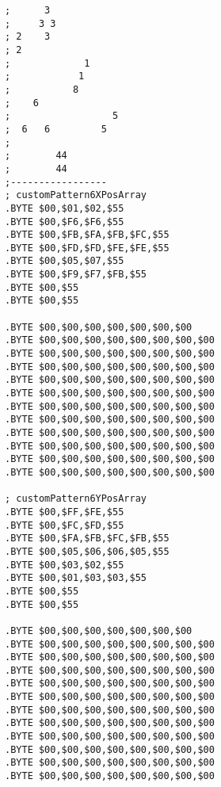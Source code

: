 \begin{minipage}[b]{0.33\linewidth}
\begin{lrbox}{\mybox}%
\begin{lstlisting}[basicstyle=\ttfamily\tiny]
;      3            
;     3 3           
; 2    3            
; 2                 
;             1     
;            1      
;           8       
;    6              
;                  5
;  6   6         5  
;                   
;        44         
;        44         
;-----------------
; customPattern6XPosArray
.BYTE $00,$01,$02,$55
.BYTE $00,$F6,$F6,$55
.BYTE $00,$FB,$FA,$FB,$FC,$55
.BYTE $00,$FD,$FD,$FE,$FE,$55
.BYTE $00,$05,$07,$55
.BYTE $00,$F9,$F7,$FB,$55
.BYTE $00,$55
.BYTE $00,$55

.BYTE $00,$00,$00,$00,$00,$00,$00
.BYTE $00,$00,$00,$00,$00,$00,$00,$00
.BYTE $00,$00,$00,$00,$00,$00,$00,$00
.BYTE $00,$00,$00,$00,$00,$00,$00,$00
.BYTE $00,$00,$00,$00,$00,$00,$00,$00
.BYTE $00,$00,$00,$00,$00,$00,$00,$00
.BYTE $00,$00,$00,$00,$00,$00,$00,$00
.BYTE $00,$00,$00,$00,$00,$00,$00,$00
.BYTE $00,$00,$00,$00,$00,$00,$00,$00
.BYTE $00,$00,$00,$00,$00,$00,$00,$00
.BYTE $00,$00,$00,$00,$00,$00,$00,$00
.BYTE $00,$00,$00,$00,$00,$00,$00,$00

; customPattern6YPosArray
.BYTE $00,$FF,$FE,$55
.BYTE $00,$FC,$FD,$55
.BYTE $00,$FA,$FB,$FC,$FB,$55
.BYTE $00,$05,$06,$06,$05,$55
.BYTE $00,$03,$02,$55
.BYTE $00,$01,$03,$03,$55
.BYTE $00,$55
.BYTE $00,$55

.BYTE $00,$00,$00,$00,$00,$00,$00
.BYTE $00,$00,$00,$00,$00,$00,$00,$00
.BYTE $00,$00,$00,$00,$00,$00,$00,$00
.BYTE $00,$00,$00,$00,$00,$00,$00,$00
.BYTE $00,$00,$00,$00,$00,$00,$00,$00
.BYTE $00,$00,$00,$00,$00,$00,$00,$00
.BYTE $00,$00,$00,$00,$00,$00,$00,$00
.BYTE $00,$00,$00,$00,$00,$00,$00,$00
.BYTE $00,$00,$00,$00,$00,$00,$00,$00
.BYTE $00,$00,$00,$00,$00,$00,$00,$00
.BYTE $00,$00,$00,$00,$00,$00,$00,$00
.BYTE $00,$00,$00,$00,$00,$00,$00,$00
\end{lstlisting}
\end{lrbox}%
\scalebox{0.8}{\usebox{\mybox}}
\end{minipage}
